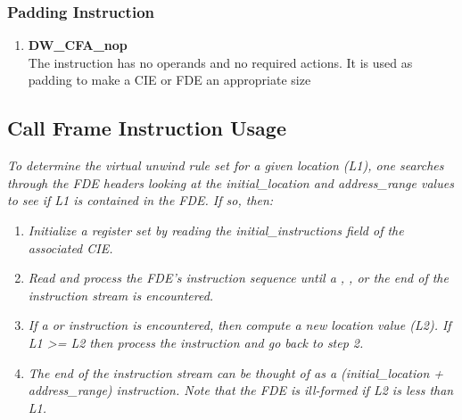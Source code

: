 \subsubsection{Padding Instruction}
\label{chap:paddinginstruction}
\begin{enumerate}[1.]
\item \textbf{DW\-\_CFA\-\_nop} \\
The  instruction has no operands and no required
actions. It is used as padding to make a CIE or FDE an
appropriate size

\end{enumerate}

\subsection{Call Frame Instruction Usage} 
\label{chap:callframeinstructionusage}

\textit{To determine the virtual unwind rule set for a given location
(L1), one searches through the FDE headers looking at the
initial\_location and address\_range values to see if L1 is
contained in the FDE. If so, then:}

\begin{enumerate}[1.]

\item \textit{Initialize a register set by reading the
initial\_instructions field of the associated CIE.}

\item \textit{Read and process the FDE’s instruction
sequence until a , 
, or the
end of the instruction stream is encountered.}

\item \textit{ If a  or 
instruction is encountered, then compute a new location value
(L2). If L1 >= L2 then process the instruction and go back
to step 2.}

\item \textit{ The end of the instruction stream can be thought
of as a  (initial\_location + address\_range)
instruction. Note that the FDE is ill-formed if L2 is less
than L1.}

\end{enumerate}

